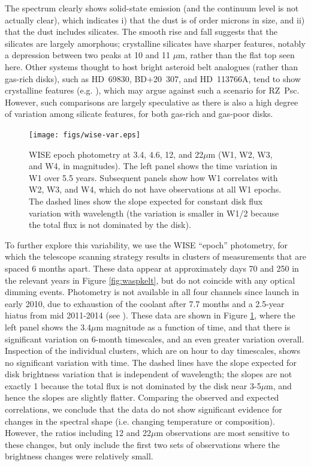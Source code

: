 \documentclass[]{rsos}
\begin{document}
The spectrum clearly shows solid-state emission (and the continuum level is not actually
clear), which indicates i) that the dust is of order microns in size, and ii) that the
dust includes silicates. The smooth rise and fall suggests that the silicates are largely
amorphous; crystalline silicates have sharper features, notably a depression between two
peaks at 10 and 11 $\mu$m, rather than the flat top seen here. Other systems thought to
host bright asteroid belt analogues (rather than gas-rich disks), such as HD~69830,
BD+20~307, and HD~113766A, tend to show crystalline features
(e.g. \cite{2005ApJ...626.1061B,2005Natur.436..363S,2012A&A...542A..90O}), which may
argue against such a scenario for RZ~Psc. However, such comparisons are largely
speculative as there is also a high degree of variation among silicate features, for both
gas-rich and gas-poor disks.

\begin{figure}
  \begin{center}
    \hspace{-0.5cm} \texttt{[image: figs/wise-var.eps]}
    \caption{WISE epoch photometry at 3.4, 4.6, 12, and 22$\mu$m (W1, W2, W3, and W4, in
      magnitudes). The left panel shows the time variation in W1 over 5.5
      years. Subsequent panels show how W1 correlates with W2, W3, and W4, which do not
      have observations at all W1 epochs. The dashed lines show the slope expected for
      constant disk flux variation with wavelength (the variation is smaller in W1/2
      because the total flux is not dominated by the disk).}\label{fig:wisevar}
  \end{center}
\end{figure}

To further explore this variability, we use the WISE ``epoch'' photometry, for which the
telescope scanning strategy results in clusters of measurements that are spaced 6 months
apart. These data appear at approximately days 70 and 250 in the relevant years in Figure
\ref{fig:waspkelt}, but do not coincide with any optical dimming events. Photometry is
not available in all four channels since launch in early 2010, due to exhaustion of the
coolant after 7.7 months and a 2.5-year hiatus from mid 2011-2014 (see
\cite{2010AJ....140.1868W,2014ApJ...792...30M}). These data are shown in Figure
\ref{fig:wisevar}, where the left panel shows the 3.4$\mu$m magnitude as a function of
time, and that there is significant variation on 6-month timescales, and an even greater
variation overall. Inspection of the individual clusters, which are on hour to day
timescales, shows no significant variation with time. The dashed lines have the slope
expected for disk brightness variation that is independent of wavelength; the slopes are
not exactly 1 because the total flux is not dominated by the disk near 3-5$\mu$m, and
hence the slopes are slightly flatter. Comparing the observed and expected correlations,
we conclude that the data do not show significant evidence for changes in the spectral
shape (i.e. changing temperature or composition). However, the ratios including 12 and
22$\mu$m observations are most sensitive to these changes, but only include the first two
sets of observations where the brightness changes were relatively small.
\end{document}
